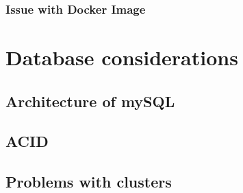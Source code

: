 \documentclass[titlepage, a4paper, 11pt]{scrartcl}
\begin{document}



            \subsubsection{Issue with Docker Image}



        
    \section{Database considerations}

        \subsection{Architecture of mySQL}


        \subsection{ACID}




        \subsection{Problems with clusters}
\end{document}
